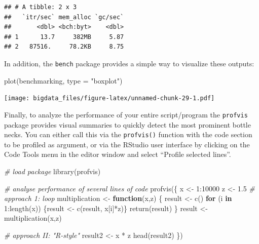 \documentclass[
  12pt,
]{style/krantz}
\newenvironment{Shaded}{\begin{snugshade}}{\end{snugshade}}
\newcommand{\AttributeTok}[1]{\textcolor[rgb]{0.77,0.63,0.00}{#1}}
\newcommand{\CommentTok}[1]{\textcolor[rgb]{0.56,0.35,0.01}{\textit{#1}}}
\newcommand{\ControlFlowTok}[1]{\textcolor[rgb]{0.13,0.29,0.53}{\textbf{#1}}}
\newcommand{\DecValTok}[1]{\textcolor[rgb]{0.00,0.00,0.81}{#1}}
\newcommand{\FloatTok}[1]{\textcolor[rgb]{0.00,0.00,0.81}{#1}}
\newcommand{\FunctionTok}[1]{\textcolor[rgb]{0.00,0.00,0.00}{#1}}
\newcommand{\NormalTok}[1]{#1}
\newcommand{\OtherTok}[1]{\textcolor[rgb]{0.56,0.35,0.01}{#1}}
\newcommand{\SpecialCharTok}[1]{\textcolor[rgb]{0.00,0.00,0.00}{#1}}
\newcommand{\StringTok}[1]{\textcolor[rgb]{0.31,0.60,0.02}{#1}}
\begin{document}
\begin{verbatim}
## # A tibble: 2 x 3
##   `itr/sec` mem_alloc `gc/sec`
##       <dbl> <bch:byt>    <dbl>
## 1      13.7     382MB     5.87
## 2   87516.     78.2KB     8.75
\end{verbatim}

In addition, the \texttt{bench} package provides a simple way to visualize these outputs:

\begin{Shaded}
\begin{Highlighting}[]
\FunctionTok{plot}\NormalTok{(benchmarking, }\AttributeTok{type =} \StringTok{"boxplot"}\NormalTok{)}
\end{Highlighting}
\end{Shaded}

\texttt{[image: bigdata\_files/figure-latex/unnamed-chunk-29-1.pdf]}

Finally, to analyze the performance of your entire script/program the \texttt{profvis} package provides visual summaries to quickly detect the most prominent bottle necks. You can either call this via the \texttt{profvis()} function with the code section to be profiled as argument, or via the RStudio user interface by clicking on the Code Tools menu in the editor window and select ``Profile selected lines''.

\begin{Shaded}
\begin{Highlighting}[]
\CommentTok{\# load package}
\FunctionTok{library}\NormalTok{(profvis)}

\CommentTok{\# analyse performance of several lines of code}
\FunctionTok{profvis}\NormalTok{(\{}
\NormalTok{        x }\OtherTok{\textless{}{-}} \DecValTok{1}\SpecialCharTok{:}\DecValTok{10000}
\NormalTok{        z }\OtherTok{\textless{}{-}} \FloatTok{1.5}
        \CommentTok{\# approach 1: loop}
\NormalTok{multiplication }\OtherTok{\textless{}{-}} 
        \ControlFlowTok{function}\NormalTok{(x,z) \{}
\NormalTok{                result }\OtherTok{\textless{}{-}} \FunctionTok{c}\NormalTok{()}
                \ControlFlowTok{for}\NormalTok{ (i }\ControlFlowTok{in} \DecValTok{1}\SpecialCharTok{:}\FunctionTok{length}\NormalTok{(x)) \{result }\OtherTok{\textless{}{-}} \FunctionTok{c}\NormalTok{(result, x[i]}\SpecialCharTok{*}\NormalTok{z)\}}
                \FunctionTok{return}\NormalTok{(result)}
\NormalTok{        \}}
\NormalTok{result }\OtherTok{\textless{}{-}} \FunctionTok{multiplication}\NormalTok{(x,z)}

\CommentTok{\# approach II: "R{-}style"}
\NormalTok{result2 }\OtherTok{\textless{}{-}}\NormalTok{ x }\SpecialCharTok{*}\NormalTok{ z }
\FunctionTok{head}\NormalTok{(result2) }
\NormalTok{\})}
\end{Highlighting}
\end{Shaded}
\end{document}
